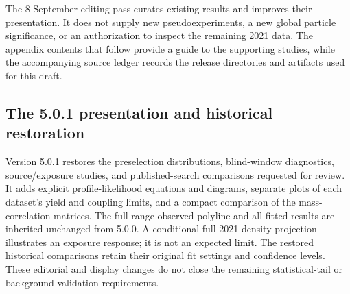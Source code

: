 The 8 September editing pass curates existing results and improves their
presentation. It does not supply new pseudoexperiments, a new global
particle significance, or an authorization to inspect the remaining
2021 data. The appendix contents that follow provide a guide to the
supporting studies, while the accompanying source ledger records the
release directories and artifacts used for this draft.

\subsection{The 5.0.1 presentation and historical restoration}
Version 5.0.1 restores the preselection distributions, blind-window diagnostics,
source/exposure studies, and published-search comparisons requested for review.
It adds explicit profile-likelihood equations and diagrams, separate plots of
each dataset's yield and coupling limits, and a compact comparison of the
mass-correlation matrices. The full-range observed polyline and all fitted
results are inherited unchanged from 5.0.0. A conditional full-2021 density
projection illustrates an exposure response; it is not an expected limit.
The restored historical comparisons retain their original fit settings and
confidence levels. These editorial and display changes do not close the
remaining statistical-tail or background-validation requirements.
